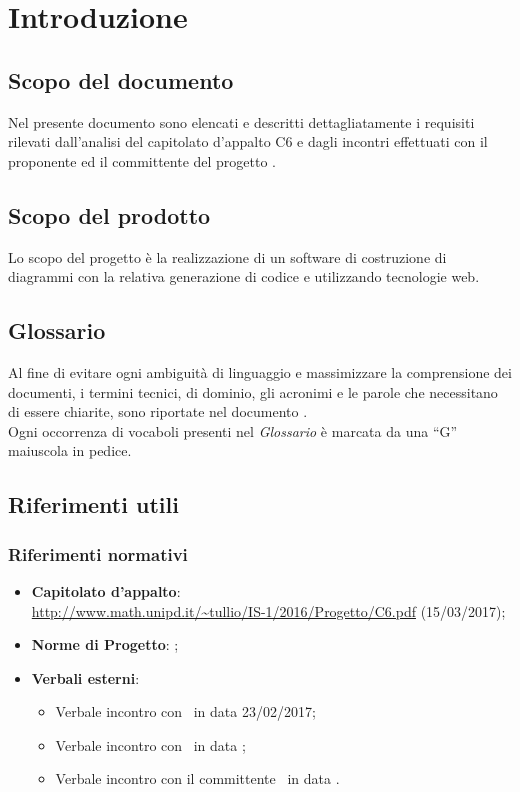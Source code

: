 \documentclass[../AnalisiDeiRequisiti.tex]{subfiles}
\begin{document}
	\section{Introduzione}
		\subsection{Scopo del documento}
			Nel presente documento sono elencati e descritti dettagliatamente i requisiti
			rilevati dall'analisi del capitolato d'appalto C6 e dagli incontri effettuati
			con il proponente ed il committente del progetto \progetto.
		\subsection{Scopo del prodotto}
			Lo scopo del progetto è la realizzazione di un software di
			costruzione di diagrammi  con la relativa generazione
			di codice  e  utilizzando tecnologie
			web.
		\subsection{Glossario}
			Al fine di evitare ogni ambiguità di linguaggio e massimizzare la
			comprensione dei documenti, i termini tecnici, di dominio, gli
			acronimi e le parole che necessitano di essere chiarite, sono
			riportate nel documento \glossariov.\\
			Ogni occorrenza di vocaboli presenti nel \textit{Glossario} è
			marcata da una ``G'' maiuscola in pedice.
		\subsection{Riferimenti utili}
			\subsubsection{Riferimenti normativi}
    			\begin{itemize}
    				\item \textbf{Capitolato d'appalto}:\\
					\url{http://www.math.unipd.it/~tullio/IS-1/2016/Progetto/C6.pdf} (15/03/2017);
					\item \textbf{Norme di Progetto}: \normediprogettov;
    				\item \textbf{Verbali esterni}:
    					\begin{itemize}
    						\item Verbale incontro con \proponente\ in data 23/02/2017;
    						\item Verbale incontro con \proponente\ in data ;	%
    						\item Verbale incontro con il committente \vardanega\ in data .	%
    					\end{itemize}
				\end{itemize}
\end{document}
